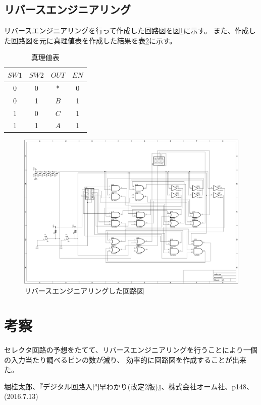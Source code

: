 \documentclass[a4paper,11pt]{ltjsarticle}
\begin{document}
\begin{table}[h]
\begin{tabular}{|c|c|c|c|c|}
\begin{minipage}{0.15\columnwidth}
    \end{minipage} \\
    \hline
  \end{tabular} 
  \label{tab:selector}
\end{table}
\subsection{リバースエンジニアリング}
リバースエンジニアリングを行って作成した回路図を図\ref{fig:reverse}に示す。
また、作成した回路図を元に真理値表を作成した結果を表\ref{tab:a}に示す。
\begin{table}[htbp]
  \centering
  \caption{真理値表}
  \begin{tabular}{|cc|cc|}
    \hline
    $SW1$  & $SW2$  &  $OUT$ & $EN$\\
    \hline
    0 & 0 &* & 0 \\
    0 & 1 &$B$ &1 \\
    1 & 0 &$C$ &1 \\
    1 & 1 &$A$ &1 \\
    \hline
  \end{tabular}
  \label{tab:a}
\end{table}
\begin{figure}
  \centering
  \includegraphics[angle = 90 , width =0.9\columnwidth]{./image/circuit.png}
  \caption{リバースエンジニアリングした回路図}
  \label{fig:reverse}
\end{figure}
\newpage
\section{考察}
セレクタ回路の予想をたてて、リバースエンジニアリングを行うことにより一個の入力当たり調べるピンの数が減り、
効率的に回路図を作成することが出来た。





\begin{thebibliography}{9}
   堀桂太郎、『デジタル回路入門早わかり(改定2版)』、株式会社オーム社、p148、(2016.7.13)
\end{thebibliography}
\end{document}
